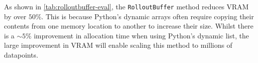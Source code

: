As shown in \ref{tab:rolloutbuffer-eval}, the \lstinline[language=Python]|RolloutBuffer| method reduces VRAM by over $50\%$.
This is because Python's dynamic arrays often require copying their contents from one memory location to another to increase their size.
Whilst there is a $\sim 5\%$ improvement in allocation time when using Python's dynamic list, the large improvement in VRAM will enable scaling this method to millions of datapoints.










